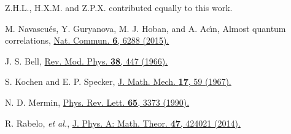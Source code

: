 \documentclass[prl,letterpaper,english,reprint,nofootinbib,aps,superscriptaddress,showpacs,showkeys]{revtex4-1}
\theoremstyle{definition}
\theoremstyle{remark}
\begin{document}
 Z.H.L., H.X.M. and Z.P.X. contributed equally to this work.



\begin{thebibliography}{10}


M. Navascu\'es, Y. Guryanova, M. J. Hoban, and A. Ac\'{\i}n,
Almost quantum correlations,
\href{https://doi.org/10.1038/ncomms7288}{Nat. Commun. \textbf{6}, 6288 (2015).}


 J. S. Bell,
 \href{http://rmp.aps.org/abstract/RMP/v38/i3/p447_1}{Rev. Mod. Phys. \textbf{38}, 447 (1966).}


 S. Kochen and E. P. Specker,
 \href{http://www.iumj.indiana.edu/IUMJ/fulltext.php?year=1968&volume=17&artid=17004}{J. Math. Mech. \textbf{17}, 59 (1967).}


N. D. Mermin,
\href{https://journals.aps.org/prl/pdf/10.1103/PhysRevLett.65.3373}
{Phys. Rev. Lett. \textbf{65}, 3373 (1990).}

 R. Rabelo, \emph{et al.},
 \href{https://iopscience.iop.org/article/10.1088/1751-8113/47/42/424021/meta}
 {J. Phys. A: Math. Theor. \textbf{47}, 424021 (2014).}






%
%
%


\end{thebibliography}
\end{document}
